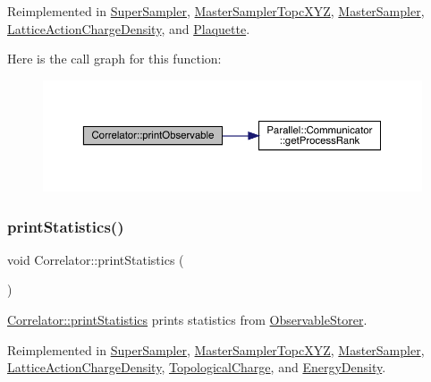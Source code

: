 Reimplemented in \mbox{\hyperlink{class_super_sampler_adf92b9281ee9a782e6c00424dd23451d}{Super\+Sampler}}, \mbox{\hyperlink{class_master_sampler_topc_x_y_z_ab2312c9e9dc1e9deeb5bce36784372ac}{Master\+Sampler\+Topc\+X\+YZ}}, \mbox{\hyperlink{class_master_sampler_a41853c3e4ab52fca7d93cf80e8702b7a}{Master\+Sampler}}, \mbox{\hyperlink{class_lattice_action_charge_density_abb7db718d4069faab0ed19f31aa85ad4}{Lattice\+Action\+Charge\+Density}}, and \mbox{\hyperlink{class_plaquette_aa15bf42749c9fd995d4d572ca3ed4f22}{Plaquette}}.

Here is the call graph for this function\+:
\nopagebreak
\begin{figure}[H]
\begin{center}
\leavevmode
\includegraphics[width=350pt]{class_correlator_a15744ddb9f2b71fff34ac762d101df38_cgraph}
\end{center}
\end{figure}
\mbox{\label{class_correlator_a2168d677f547769784781d2e2aaa53cf}} 
\subsubsection{\texorpdfstring{printStatistics()}{printStatistics()}}
{\footnotesize\ttfamily void Correlator\+::print\+Statistics (\begin{DoxyParamCaption}{ }\end{DoxyParamCaption})\hspace{0.3cm}{\ttfamily [virtual]}}



\mbox{\hyperlink{class_correlator_a2168d677f547769784781d2e2aaa53cf}{Correlator\+::print\+Statistics}} prints statistics from \mbox{\hyperlink{class_observable_storer}{Observable\+Storer}}. 



Reimplemented in \mbox{\hyperlink{class_super_sampler_a04b230314ae446c77172c97ff52cf4f3}{Super\+Sampler}}, \mbox{\hyperlink{class_master_sampler_topc_x_y_z_a5a34a7f90ce8eea6c0efa06cfdfeb5f1}{Master\+Sampler\+Topc\+X\+YZ}}, \mbox{\hyperlink{class_master_sampler_a9accfc83c05d3013396355e40257a562}{Master\+Sampler}}, \mbox{\hyperlink{class_lattice_action_charge_density_abdaa497dd70dee58b810de7315241a56}{Lattice\+Action\+Charge\+Density}}, \mbox{\hyperlink{class_topological_charge_ad56263921d283d315b04ab40c9594a2c}{Topological\+Charge}}, and \mbox{\hyperlink{class_energy_density_ad108e32bc670f17f15b4ed433d8bbec7}{Energy\+Density}}.

